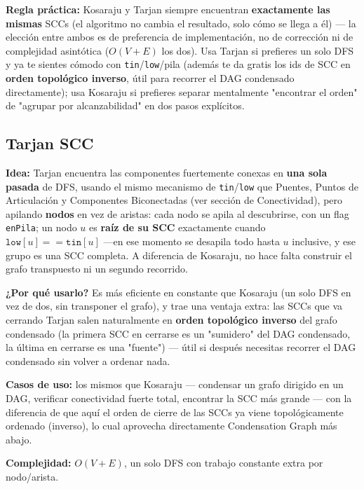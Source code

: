 \documentclass[10pt,a4paper,twocolumn]{article}
\begin{document}
\textbf{Regla práctica:} Kosaraju y Tarjan siempre encuentran
\textbf{exactamente las mismas} SCCs (el algoritmo no cambia el
resultado, solo cómo se llega a él) — la elección entre ambos es de
preferencia de implementación, no de corrección ni de complejidad
asintótica ($O(V+E)$ los dos). Usa Tarjan si prefieres un solo DFS y
ya te sientes cómodo con \texttt{tin}/\texttt{low}/pila (además te da
gratis los ids de SCC en \textbf{orden topológico inverso}, útil para
recorrer el DAG condensado directamente); usa Kosaraju si prefieres
separar mentalmente "encontrar el orden" de "agrupar por
alcanzabilidad" en dos pasos explícitos.

\subsection{Tarjan SCC}

\textbf{Idea:} Tarjan encuentra las componentes fuertemente conexas
en \textbf{una sola pasada} de DFS, usando el mismo mecanismo de
\texttt{tin}/\texttt{low} que Puentes, Puntos de Articulación y
Componentes Biconectadas (ver sección de Conectividad), pero apilando
\textbf{nodos} en vez de aristas: cada nodo se apila al descubrirse,
con un flag \texttt{enPila}; un nodo $u$ es \textbf{raíz de su SCC}
exactamente cuando $\texttt{low}[u] == \texttt{tin}[u]$ —en ese
momento se desapila todo hasta $u$ inclusive, y ese grupo es una SCC
completa. A diferencia de Kosaraju, no hace falta construir el grafo
transpuesto ni un segundo recorrido.

\textbf{¿Por qué usarlo?} Es más eficiente en constante que Kosaraju
(un solo DFS en vez de dos, sin transponer el grafo), y trae una
ventaja extra: las SCCs que va cerrando Tarjan salen naturalmente en
\textbf{orden topológico inverso} del grafo condensado (la primera
SCC en cerrarse es un "sumidero" del DAG condensado, la última en
cerrarse es una "fuente") — útil si después necesitas recorrer el
DAG condensado sin volver a ordenar nada.

\textbf{Casos de uso:} los mismos que Kosaraju — condensar un grafo
dirigido en un DAG, verificar conectividad fuerte total, encontrar la
SCC más grande — con la diferencia de que aquí el orden de cierre de
las SCCs ya viene topológicamente ordenado (inverso), lo cual
aprovecha directamente Condensation Graph más abajo.

\textbf{Complejidad:} $O(V + E)$, un solo DFS con trabajo constante
extra por nodo/arista.
\end{document}
